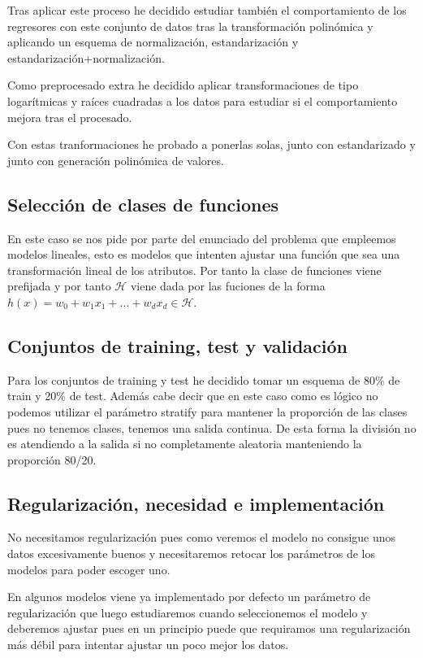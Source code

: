 \documentclass[12pt,a4paper]{article}
\begin{document}
Tras aplicar este proceso he decidido estudiar también el comportamiento de los regresores con este conjunto de datos tras la transformación polinómica y aplicando un esquema de normalización, estandarización y estandarización+normalización.

Como preprocesado extra he decidido aplicar transformaciones de tipo logarítmicas y raíces cuadradas a los datos para estudiar si el comportamiento mejora tras el procesado. 

Con estas tranformaciones he probado a ponerlas solas, junto con estandarizado y junto con generación polinómica de valores.

\subsection{Selección de clases de funciones}

En este caso se nos pide por parte del enunciado del problema que empleemos modelos lineales, esto es modelos que intenten ajustar una función que sea una transformación lineal de los atributos. Por tanto la clase de funciones viene prefijada y por tanto $\mathcal{H}$ viene dada por las fuciones de la forma $h(x) = w_0 + w_1 x_1 + ... + w_d x_d \in \mathcal{H}$.

\subsection{Conjuntos de training, test y validación}

Para los conjuntos de training y test he decidido tomar un esquema de 80\% de train y 20\% de test. Además cabe decir que en este caso como es lógico no podemos utilizar el parámetro stratify para mantener la proporción de las clases pues no tenemos clases, tenemos una salida continua. De esta forma la división no es atendiendo a la salida si no completamente aleatoria manteniendo la proporción 80/20.

\subsection{Regularización, necesidad e implementación}

No necesitamos regularización pues como veremos el modelo no consigue unos datos excesivamente buenos y necesitaremos retocar los parámetros de los modelos para poder escoger uno.

En algunos modelos viene ya implementado por defecto un parámetro de regularización que luego estudiaremos cuando seleccionemos el modelo y deberemos ajustar pues en un principio puede que requiramos una regularización más débil para intentar ajustar un poco mejor los datos.
\end{document}
